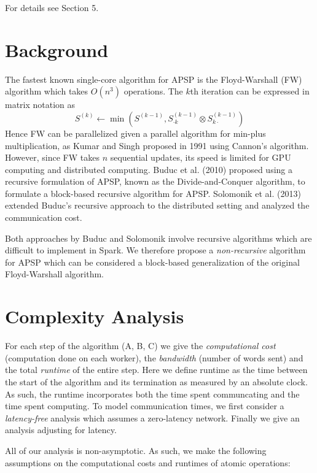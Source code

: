 \documentclass{article} %
\begin{document}
For details see Section 5.

\section{Background}

The fastest known single-core algorithm for APSP is the Floyd-Warshall (FW)
algorithm which takes $O(n^3)$ operations.  The $k$th iteration can be
expressed in matrix notation as
\[
S^{(k)} \leftarrow \min(S^{(k-1)}, S^{(k-1)}_{\cdot k} \otimes S^{(k-1)}_{k \cdot})
\]
Hence FW can be parallelized given a parallel algorithm for min-plus
multiplication, as Kumar and Singh proposed in 1991 using Cannon's
algorithm.  However, since FW takes $n$ sequential updates, its speed
is limited for GPU computing and distributed computing.  Buduc et
al. (2010) proposed using a recursive formulation of APSP, known as
the Divide-and-Conquer algorithm, to formulate a block-based recursive
algorithm for APSP.  Solomonik et al. (2013) extended Buduc's
recursive approach to the distributed setting and analyzed the
communication cost.

Both approaches by Buduc and Solomonik involve recursive algorithms
which are difficult to implement in Spark.  We therefore propose a
\emph{non-recursive} algorithm for APSP which can be considered a
block-based generalization of the original Floyd-Warshall algorithm.

\section{Complexity Analysis}

For each step of the algorithm (A, B, C) we give the \emph{computational cost} (computation done
on each worker), the \emph{bandwidth} (number of words sent) and the
total \emph{runtime} of the entire step.  Here we define runtime as
the time between the start of the algorithm and its termination as
measured by an absolute clock. As such, the runtime incorporates both
the time spent communcating and the time spent computing.  To model
communication times, we first consider a \emph{latency-free} analysis
which assumes a zero-latency network.  Finally we give an analysis
adjusting for latency.

All of our analysis is non-asymptotic.  As such, we make the following
assumptions on the computational costs and runtimes of atomic
operations:
\end{document}
